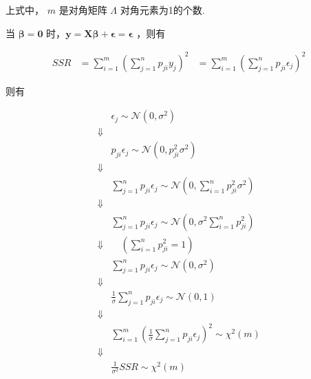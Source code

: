 \documentclass[UTF8]{ctexart}
\begin{document}
    上式中， $ m $ 是对角矩阵 $ \boldsymbol{\varLambda} $ 对角元素为1的个数.
    
    
    当 $ \boldsymbol{\beta} = \boldsymbol{0}$ 时，$ \boldsymbol{y} = \boldsymbol{X} \boldsymbol{\beta} + \boldsymbol{\epsilon} = \boldsymbol{\epsilon} $ ，则有
    
    \begin{equation}
    	\begin{aligned}
    		SSR & = \sum_{i=1}^{m}{(\sum_{j=1}^{n}{p_{ji} y_{j}})^2}
    		& = \sum_{i=1}^{m}{(\sum_{j=1}^{n}{p_{ji} \epsilon_{j}})^2}
    	\end{aligned}
    \end{equation}

    则有
    
    \begin{equation}
        \begin{aligned}
        	& \epsilon_{j} \sim \mathcal{N}(0, \sigma^2) \\
        	\Downarrow & \\
        	& p_{ji} \epsilon_{j} \sim \mathcal{N}(0, p_{ji}^2 \sigma^2) \\
        	\Downarrow & \\
        	& \sum_{j=1}^{n}{p_{ji} \epsilon_{j}} \sim \mathcal{N}(0, \sum_{i=1}^{n}p_{ji}^2 \sigma^2) \\
        	\Downarrow & \\
        	& \sum_{j=1}^{n}{p_{ji} \epsilon_{j}} \sim \mathcal{N}(0, \sigma^2 \sum_{i=1}^{n}p_{ji}^2) \\
        	\Downarrow & \quad (\sum_{i=1}^{n}p_{ji}^2 = 1) \\
        	& \sum_{j=1}^{n}{p_{ji} \epsilon_{j}} \sim \mathcal{N}(0, \sigma^2) \\
        	\Downarrow & \\
        	& \frac{1}{\sigma} \sum_{j=1}^{n}{p_{ji} \epsilon_{j}} \sim \mathcal{N}(0, 1) \\
        	\Downarrow & \\
        	& \sum_{i=1}^{m}{(\frac{1}{\sigma} \sum_{j=1}^{n}{p_{ji} \epsilon_{j}})^2} \sim \mathcal{\chi}^2(m) \\
        	\Downarrow & \\
        	& \frac{1}{\sigma^2} SSR \sim \mathcal{\chi}^2(m)
        \end{aligned}
    \end{equation}


    
    
\end{document}
